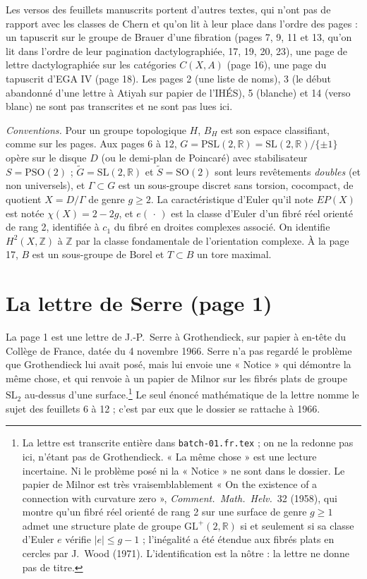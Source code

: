 \documentclass[11pt,a4paper]{article}
\begin{document}
Les versos des feuillets manuscrits portent d'autres textes, qui n'ont pas de
rapport avec les classes de Chern et qu'on lit à leur place dans l'ordre des
pages : un tapuscrit sur le groupe de Brauer d'une fibration (pages 7, 9, 11
et 13, qu'on lit dans l'ordre de leur pagination dactylographiée, 17, 19, 20,
23), une page de lettre dactylographiée sur les catégories $C(X,A)$
(page 16), une page du tapuscrit d'EGA IV (page 18). Les pages 2 (une liste
de noms), 3 (le début abandonné d'une lettre à Atiyah sur papier de l'IHÉS),
5 (blanche) et 14 (verso blanc) ne sont pas transcrites et ne sont pas lues
ici.

\emph{Conventions.} Pour un groupe topologique $H$, $B_{H}$ est son espace
classifiant, comme sur les pages. Aux pages 6 à 12, $G = \mathrm{PSL}(2,
\mathbb{R}) = \mathrm{SL}(2,\mathbb{R})/\{\pm 1\}$ opère sur le disque $D$
(ou le demi-plan de Poincaré) avec stabilisateur $S = \mathrm{PSO}(2)$ ;
$\widetilde{G} = \mathrm{SL}(2,\mathbb{R})$ et $\widetilde{S} =
\mathrm{SO}(2)$ sont leurs revêtements \emph{doubles} (et non universels),
et $\Gamma \subset G$ est un sous-groupe discret sans torsion, cocompact, de
quotient $X = D/\Gamma$ de genre $g \geq 2$. La caractéristique d'Euler
qu'il note $EP(X)$ est notée $\chi(X) = 2 - 2g$, et $e(\,\cdot\,)$ est la
classe d'Euler d'un fibré réel orienté de rang 2, identifiée à $c_{1}$ du
fibré en droites complexes associé. On identifie $H^{2}(X,\mathbb{Z})$ à
$\mathbb{Z}$ par la classe fondamentale de l'orientation complexe. À la
page 17, $B$ est un sous-groupe de Borel et $T \subset B$ un tore maximal.

\section*{La lettre de Serre (page 1)}

La page 1 est une lettre de J.-P.\ Serre à Grothendieck, sur papier à en-tête
du Collège de France, datée du 4 novembre 1966. Serre n'a pas regardé le
problème que Grothendieck lui avait posé, mais lui envoie une « Notice » qui
démontre la même chose, et qui renvoie à un papier de Milnor sur les fibrés
plats de groupe $\mathrm{SL}_{2}$ au-dessus d'une surface.\footnote{La lettre
est transcrite entière dans \texttt{batch-01.fr.tex} ; on ne la redonne pas
ici, n'étant pas de Grothendieck. « La même chose » est une lecture
incertaine. Ni le problème posé ni la « Notice » ne sont dans le dossier.
Le papier de Milnor est très vraisemblablement « On the existence of a
connection with curvature zero », \emph{Comment.\ Math.\ Helv.}\ 32 (1958),
qui montre qu'un fibré réel orienté de rang 2 sur une surface de genre $g
\geq 1$ admet une structure plate de groupe $\mathrm{GL}^{+}(2,\mathbb{R})$
si et seulement si sa classe d'Euler $e$ vérifie $|e| \leq g - 1$ ; l'inégalité
a été étendue aux fibrés plats en cercles par J.\ Wood (1971). L'identification
est la nôtre : la lettre ne donne pas de titre.} Le seul énoncé mathématique
de la lettre nomme le sujet des feuillets 6 à 12 ; c'est par eux que le
dossier se rattache à 1966.
\end{document}
